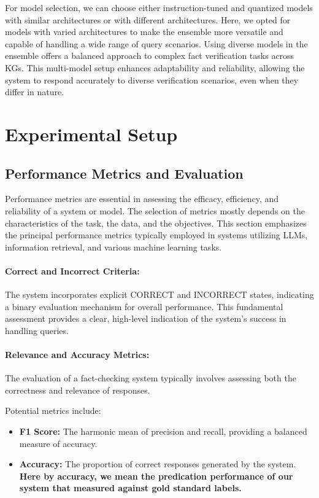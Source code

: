 For model selection, we can choose either instruction-tuned and quantized models with similar architectures or with different architectures.
Here, we opted for models with varied architectures to make the ensemble more versatile and capable of handling a wide range of query scenarios.
Using diverse models in the ensemble offers a balanced approach to complex fact verification tasks across \acp{KG}.
This multi-model setup enhances adaptability and reliability, allowing the system to respond accurately to diverse verification scenarios, even when they differ in nature.

\section{Experimental Setup}\label{sec:empirical-evaluation:experimental-setup}
\subsection{Performance Metrics and Evaluation}\label{subsec:empirical-evaluation:experimental-setup:performance-metrics-and-evaluation}
Performance metrics are essential in assessing the efficacy, efficiency, and reliability of a system or model.
The selection of metrics mostly depends on the characteristics of the task, the data, and the objectives.
This section emphasizes the principal performance metrics typically employed in systems utilizing LLMs, information retrieval, and various machine learning tasks.
\paragraph{Correct and Incorrect Criteria:}
The system incorporates explicit CORRECT and INCORRECT states, indicating a binary evaluation mechanism for overall performance.
This fundamental assessment provides a clear, high-level indication of the system's success in handling queries.
\paragraph{Relevance and Accuracy Metrics:}
The evaluation of a fact-checking system typically involves assessing both the correctness and relevance of responses.

Potential metrics include:
\begin{itemize}
    \item \textbf{F1 Score:} The harmonic mean of precision and recall, providing a balanced measure of accuracy.
    \item \textbf{Accuracy:} The proportion of correct responses generated by the system. \textbf{Here by accuracy, we mean the predication performance of our system that measured against gold standard labels.}
\end{itemize}

